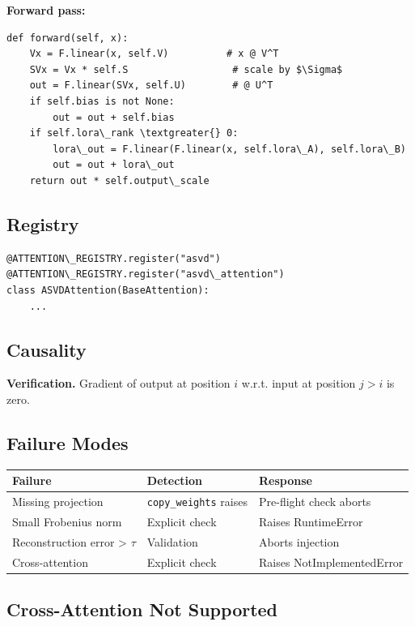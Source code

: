 \textbf{Forward pass:}

\begin{lstlisting}
def forward(self, x):
    Vx = F.linear(x, self.V)          # x @ V^T
    SVx = Vx * self.S                  # scale by $\Sigma$
    out = F.linear(SVx, self.U)        # @ U^T
    if self.bias is not None:
        out = out + self.bias
    if self.lora\_rank \textgreater{} 0:
        lora\_out = F.linear(F.linear(x, self.lora\_A), self.lora\_B)
        out = out + lora\_out
    return out * self.output\_scale
\end{lstlisting}

\subsection{Registry}

\begin{lstlisting}
@ATTENTION\_REGISTRY.register("asvd")
@ATTENTION\_REGISTRY.register("asvd\_attention")
class ASVDAttention(BaseAttention):
    ...
\end{lstlisting}

\subsection{Causality}

\textbf{Verification.} Gradient of output at position $i$ w.r.t. input at 
position $j > i$ is zero.

\subsection{Failure Modes}

\begin{table}[H]
\centering
\small
\begin{tabular}{lll}
\toprule
\textbf{Failure} & \textbf{Detection} & \textbf{Response} \\
\midrule
Missing projection & \texttt{copy\_weights} raises & Pre-flight check aborts \\
Small Frobenius norm & Explicit check & Raises RuntimeError \\
Reconstruction error \textgreater{} $\tau$ & Validation & Aborts injection \\
Cross-attention & Explicit check & Raises NotImplementedError \\
\bottomrule
\end{tabular}
\end{table}

\subsection{Cross-Attention Not Supported}

